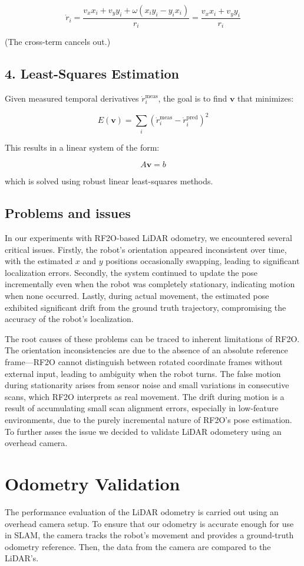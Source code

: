 \[
\dot{r}_i = \frac{v_x x_i + v_y y_i + \omega (x_i y_i - y_i x_i)}{r_i} = \frac{v_x x_i + v_y y_i}{r_i}
\]

(The cross-term cancels out.)

\subsection*{4. Least-Squares Estimation}

Given measured temporal derivatives $\dot{r}_i^{\text{meas}}$, the goal is to find $\mathbf{v}$ that minimizes:

\[
E(\mathbf{v}) = \sum_i \left( \dot{r}_i^{\text{meas}} - \dot{r}_i^{\text{pred}} \right)^2
\]

This results in a linear system of the form:

\[
A \mathbf{v} = b
\]

which is solved using robust linear least-squares methods.

\subsection*{Problems and issues}
In our experiments with RF2O-based LiDAR odometry, we encountered several critical issues. Firstly, the robot's orientation appeared inconsistent over time, with the estimated $x$ and $y$ positions occasionally swapping, leading to significant localization errors. Secondly, the system continued to update the pose incrementally even when the robot was completely stationary, indicating motion when none occurred. Lastly, during actual movement, the estimated pose exhibited significant drift from the ground truth trajectory, compromising the accuracy of the robot's localization.

The root causes of these problems can be traced to inherent limitations of RF2O. The orientation inconsistencies are due to the absence of an absolute reference frame—RF2O cannot distinguish between rotated coordinate frames without external input, leading to ambiguity when the robot turns. The false motion during stationarity arises from sensor noise and small variations in consecutive scans, which RF2O interprets as real movement. The drift during motion is a result of accumulating small scan alignment errors, especially in low-feature environments, due to the purely incremental nature of RF2O's pose estimation. To further asses the issue we decided to validate LiDAR odometery using an overhead camera.
\section*{Odometry Validation}
\quad The performance evaluation of the LiDAR odometry is carried out using an overhead camera setup. To ensure that our odometry is accurate enough for use in SLAM, the camera tracks the robot’s movement and provides a ground-truth odometry reference. Then, the data from the camera are compared to the LiDAR's.


